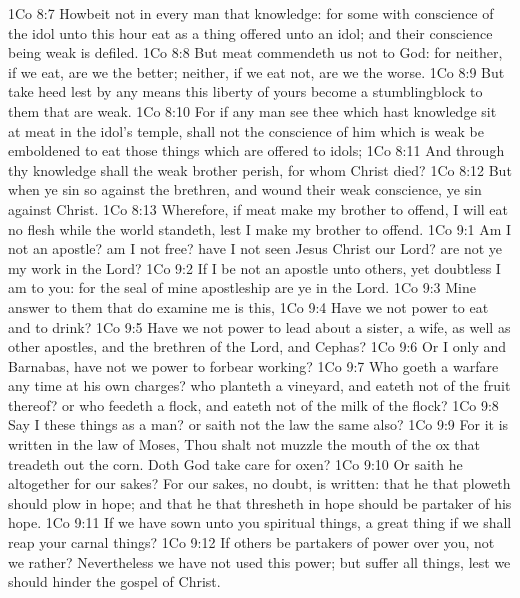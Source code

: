 \vs 1Co 8:7 Howbeit  not in every man that knowledge: for some with conscience of the idol unto this hour eat  as a thing offered unto an idol; and their conscience being weak is defiled.
\vs 1Co 8:8 But meat commendeth us not to God: for neither, if we eat, are we the better; neither, if we eat not, are we the worse.
\vs 1Co 8:9 But take heed lest by any means this liberty of yours become a stumblingblock to them that are weak.
\vs 1Co 8:10 For if any man see thee which hast knowledge sit at meat in the idol's temple, shall not the conscience of him which is weak be emboldened to eat those things which are offered to idols;
\vs 1Co 8:11 And through thy knowledge shall the weak brother perish, for whom Christ died?
\vs 1Co 8:12 But when ye sin so against the brethren, and wound their weak conscience, ye sin against Christ.
\vs 1Co 8:13 Wherefore, if meat make my brother to offend, I will eat no flesh while the world standeth, lest I make my brother to offend.
\vs 1Co 9:1 Am I not an apostle? am I not free? have I not seen Jesus Christ our Lord? are not ye my work in the Lord?
\vs 1Co 9:2 If I be not an apostle unto others, yet doubtless I am to you: for the seal of mine apostleship are ye in the Lord.
\vs 1Co 9:3 Mine answer to them that do examine me is this,
\vs 1Co 9:4 Have we not power to eat and to drink?
\vs 1Co 9:5 Have we not power to lead about a sister, a wife, as well as other apostles, and  the brethren of the Lord, and Cephas?
\vs 1Co 9:6 Or I only and Barnabas, have not we power to forbear working?
\vs 1Co 9:7 Who goeth a warfare any time at his own charges? who planteth a vineyard, and eateth not of the fruit thereof? or who feedeth a flock, and eateth not of the milk of the flock?
\vs 1Co 9:8 Say I these things as a man? or saith not the law the same also?
\vs 1Co 9:9 For it is written in the law of Moses, Thou shalt not muzzle the mouth of the ox that treadeth out the corn. Doth God take care for oxen?
\vs 1Co 9:10 Or saith he  altogether for our sakes? For our sakes, no doubt,  is written: that he that ploweth should plow in hope; and that he that thresheth in hope should be partaker of his hope.
\vs 1Co 9:11 If we have sown unto you spiritual things,  a great thing if we shall reap your carnal things?
\vs 1Co 9:12 If others be partakers of  power over you,  not we rather? Nevertheless we have not used this power; but suffer all things, lest we should hinder the gospel of Christ.
